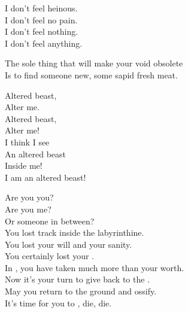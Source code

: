 I don't feel heinous. \\
I don't feel no pain. \\
I don't feel nothing. \\
I don't feel anything. \\


The sole thing that will make your void obsolete \\
Is to find someone new, some sapid fresh meat. \\


Altered beast, \\
Alter me. \\
Altered beast, \\
Alter me! \\

I think I see \\
An altered beast \\
Inside me! \\

I am an altered beast! \\





Are you you? \\
Are you me? \\
Or someone in between? \\

You lost track inside the labyrinthine. \\
You lost your will and your sanity. \\
You certainly lost your . \\

In , you have taken much more than your worth. \\
Now it's your turn to give back to the . \\

May you return to the ground and ossify. \\
It's time for you to , die, die. \\


